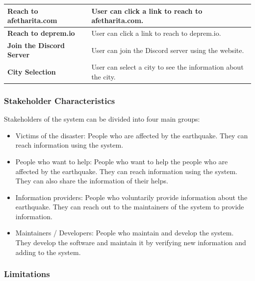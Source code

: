 \documentclass[a4paper]{article}
\begin{document}
\begin{table}[h]
{\begin{tabular}{|l|l|}
                    \textbf{Reach to afetharita.com} & User can click a link to reach to afetharita.com. \\ \hline
                    \textbf{Reach to deprem.io} & User can click a link to reach to deprem.io. \\ \hline
                    \textbf{Join the Discord Server} & User can join the Discord server using the website. \\ \hline
                    \textbf{City Selection} & User can select a city to see the information about the city. \\ \hline
                    \end{tabular}%
                    }
                \end{table}
                \vspace{1cm}

                \subsubsection{Stakeholder Characteristics}

                Stakeholders of the system can be divided into four main groups:
                \begin{itemize}
                    \item Victims of the disaster: People who are affected by the earthquake. They can reach information using the system.
                    \item People who want to help: People who want to help the people who are affected by the earthquake. They can reach information using the system. They can also share the information of their helps.
                    \item Information providers: People who voluntarily provide information about the earthquake. They can reach out to the maintainers of the system to provide information.
                    \item Maintainers / Developers: People who maintain and develop the system. They develop the software and maintain it by verifying new information and adding to the system.
                \end{itemize}

                \subsubsection{Limitations}
\end{document}
